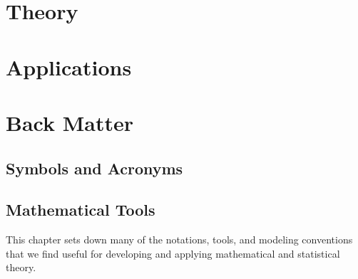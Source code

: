 \documentclass[openany,wjd]{tshomult}
\begin{document}

\frontmatter%

%

\tableofcontents

\mainmatter%
\part{Theory}\label{part:theory}
%


\part{Applications}\label{part:applications}


%

\backmatter%
\appendix
\part{Back Matter}
\chapter{Symbols and Acronyms}


\chapter{Mathematical Tools}
This chapter sets down many of the notations, tools, and
modeling conventions that we find useful for developing and
applying mathematical and statistical theory. 



 

\printindex
\end{document}
